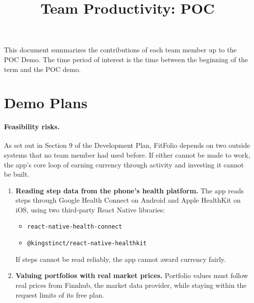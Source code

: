 \documentclass{article}
\title{Team Productivity: POC\\\progname}
\author{\authname}
\date{}
\begin{document}
\maketitle

This document summarizes the contributions of each team member up to the POC
Demo.  The time period of interest is the time between the beginning of the term
and the POC demo.




\section{Demo Plans}



\paragraph{Feasibility risks.} As set out in Section 9 of the Development
Plan, FitFolio depends on two outside systems that no team member had used
before. If either cannot be made to work, the app's core loop of earning
currency through activity and investing it cannot be built.

\begin{enumerate}
\item \textbf{Reading step data from the phone's health platform.} The app
  reads steps through Google Health Connect on Android and Apple HealthKit on
  iOS, using two third-party React Native libraries:
  \begin{itemize}
  \item \texttt{react-native-health-connect}
  \item \texttt{@kingstinct/react-native-healthkit}
  \end{itemize}
  If steps cannot be read reliably, the app cannot award currency fairly.
\item \textbf{Valuing portfolios with real market prices.} Portfolio values
  must follow real prices from Finnhub, the market data provider, while
  staying within the request limits of its free plan.
\end{enumerate}
\end{document}
